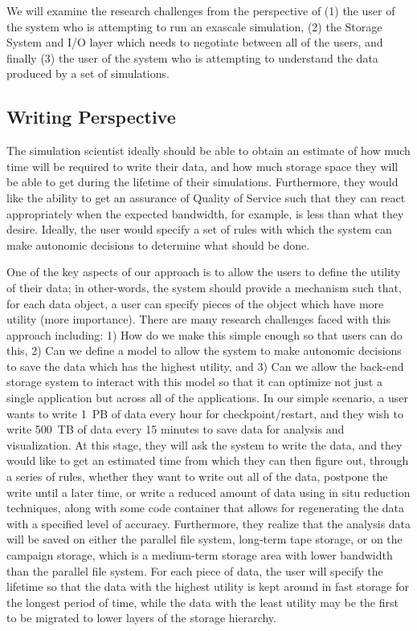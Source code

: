 We will examine the research challenges from the perspective of
%
(1) the user of the system who is attempting to run an exascale simulation,
%
(2) the Storage System and I/O layer which needs to negotiate between all of
the users, and finally
%
(3) the user of the system who is attempting to understand the data
produced by a set of simulations.

\subsection{Writing Perspective}
\label{subsec:sim-perspective}
The simulation scientist ideally should be able to
obtain an estimate of how much time will be required to write their data,
and how much storage space they will be able to get during the lifetime of
their simulations. Furthermore, they would like the ability to get an assurance
of Quality of Service such that they can react appropriately when the
expected bandwidth, for example, is less than what they desire. Ideally, the user
would specify a set of rules with which the system can make autonomic
decisions to determine what should be done.
%

One of the key aspects of our approach is to allow the users to define the
utility of their data; in other-words, the system should provide a
mechanism such that, for each data object, a user can specify pieces of the object
which have more utility (more importance).
There are many research challenges faced with
this approach including: 1) How do we make this simple enough so that users can
do this, 2) Can we define a model to allow the system to make
autonomic decisions to save the data which has the highest utility, and 3) Can
we allow the back-end storage system to interact with this model so that
it can optimize not just a single application but across all of the
applications.
  In our simple scenario, a user wants to write 1~PB of data every hour
for checkpoint/restart, and they wish to write 500~TB of data every 15
minutes to save data for analysis and visualization. At this stage, they will ask the system to
write the data, and they would like to get an estimated time from which they can
then figure out, through a series of rules, whether they want to write out all
of the data, postpone the write until a later time, or write a reduced amount
of data using in situ reduction techniques, along with some code
container that allows for regenerating the data with a specified level of
accuracy.  Furthermore, they realize that the analysis data will be saved on
either the parallel file system, long-term tape storage, or on the campaign storage,
which is a medium-term storage
area with lower bandwidth than the parallel file system.
For each piece of data, the user will specify the lifetime so
that the data with the highest utility is kept around in fast storage for the longest
period of time, while the data with the least utility may be the first to be migrated to
lower layers of the storage hierarchy. 

